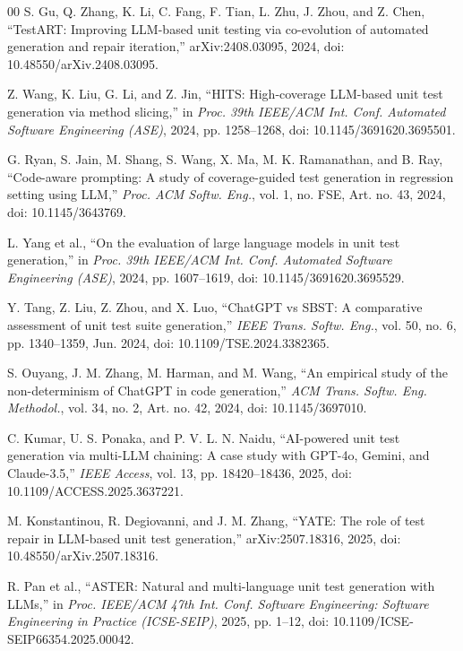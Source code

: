 \documentclass[conference]{IEEEtran}
\begin{document}
\begin{thebibliography}{00}
S. Gu, Q. Zhang, K. Li, C. Fang, F. Tian, L. Zhu, J. Zhou, and Z. Chen, ``TestART: Improving LLM-based unit testing via co-evolution of automated generation and repair iteration,'' arXiv:2408.03095, 2024, doi: 10.48550/arXiv.2408.03095.

Z. Wang, K. Liu, G. Li, and Z. Jin, ``HITS: High-coverage LLM-based unit test generation via method slicing,'' in \emph{Proc. 39th IEEE/ACM Int. Conf. Automated Software Engineering (ASE)}, 2024, pp. 1258--1268, doi: 10.1145/3691620.3695501.

G. Ryan, S. Jain, M. Shang, S. Wang, X. Ma, M. K. Ramanathan, and B. Ray, ``Code-aware prompting: A study of coverage-guided test generation in regression setting using LLM,'' \emph{Proc. ACM Softw. Eng.}, vol. 1, no. FSE, Art. no. 43, 2024, doi: 10.1145/3643769.

L. Yang et al., ``On the evaluation of large language models in unit test generation,'' in \emph{Proc. 39th IEEE/ACM Int. Conf. Automated Software Engineering (ASE)}, 2024, pp. 1607--1619, doi: 10.1145/3691620.3695529.

Y. Tang, Z. Liu, Z. Zhou, and X. Luo, ``ChatGPT vs SBST: A comparative assessment of unit test suite generation,'' \emph{IEEE Trans. Softw. Eng.}, vol. 50, no. 6, pp. 1340--1359, Jun. 2024, doi: 10.1109/TSE.2024.3382365.

S. Ouyang, J. M. Zhang, M. Harman, and M. Wang, ``An empirical study of the non-determinism of ChatGPT in code generation,'' \emph{ACM Trans. Softw. Eng. Methodol.}, vol. 34, no. 2, Art. no. 42, 2024, doi: 10.1145/3697010.

C. Kumar, U. S. Ponaka, and P. V. L. N. Naidu, ``AI-powered unit test generation via multi-LLM chaining: A case study with GPT-4o, Gemini, and Claude-3.5,'' \emph{IEEE Access}, vol. 13, pp. 18420--18436, 2025, doi: 10.1109/ACCESS.2025.3637221.

M. Konstantinou, R. Degiovanni, and J. M. Zhang, ``YATE: The role of test repair in LLM-based unit test generation,'' arXiv:2507.18316, 2025, doi: 10.48550/arXiv.2507.18316.

R. Pan et al., ``ASTER: Natural and multi-language unit test generation with LLMs,'' in \emph{Proc. IEEE/ACM 47th Int. Conf. Software Engineering: Software Engineering in Practice (ICSE-SEIP)}, 2025, pp. 1--12, doi: 10.1109/ICSE-SEIP66354.2025.00042.


\end{thebibliography}
\end{document}
